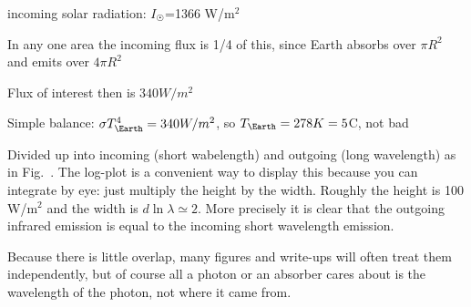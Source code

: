 \documentclass[11pt]{book}
\begin{document}

\bei
\item incoming solar radiation: $I_\Sun$=1366 W/m$^2$
\item In any one area the incoming flux is 1/4 of this, since Earth absorbs over $\pi R^2$ and emits over $4\pi R^2$
\item Flux of interest then is $340 W/m^2$
\item Simple balance: $\sigma T_\Earth^4 = 340 W/m^2$, so $T_\Earth=278K=5$C, not bad
\item Divided up into incoming (short wabelength) and outgoing (long wavelength) as in Fig.~. The log-plot is a convenient way to display this because you can integrate by eye: just multiply the height by the width. Roughly the height is 100 W/m$^2$ and the width is $d\ln\lambda \simeq 2$. More precisely it is clear that the outgoing infrared emission is equal to the incoming short wavelength emission.
\item Because there is little overlap, many figures and write-ups will often treat them independently, but of course all a photon or an absorber cares about is the wavelength of the photon, not where it came from.
\eei 



\end{document}
